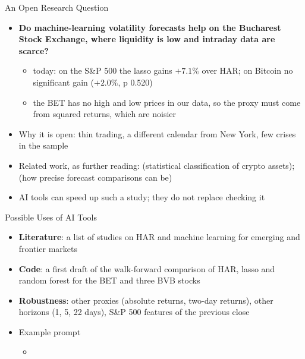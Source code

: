 \begin{frame}{An Open Research Question}
\itemsize{\small}
\begin{itemize}
    \item \textbf{Do machine-learning volatility forecasts help on the Bucharest Stock Exchange, where liquidity is low and intraday data are scarce?}
    \begin{itemize}
        \item today: on the S\&P 500 the lasso gains $+7.1\%$ over HAR; on Bitcoin no significant gain ($+2.0\%$, p 0.520)
        \item the BET has no high and low prices in our data, so the proxy must come from squared returns, which are noisier
    \end{itemize}
    \item Why it is open: thin trading, a different calendar from New York, few crises in the sample
    \item Related work, as further reading:  (statistical classification of crypto assets);  (how precise forecast comparisons can be)
    \item AI tools can speed up such a study; they do not replace checking it 
\end{itemize}
\end{frame}

\begin{frame}{Possible Uses of AI Tools}
\itemsize{\small}
\begin{itemize}
    \item \textbf{Literature}: a list of studies on HAR and machine learning for emerging and frontier markets
    \item \textbf{Code}: a first draft of the walk-forward comparison of HAR, lasso and random forest for the BET and three BVB stocks
    \item \textbf{Robustness}: other proxies (absolute returns, two-day returns), other horizons (1, 5, 22 days), S\&P 500 features of the previous close
    \item Example prompt
    \begin{itemize}
        \item {}
    \end{itemize}
\end{itemize}
\end{frame}

